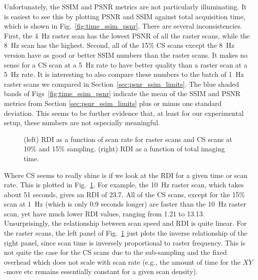 \documentclass[twocolumn,oneside]{IEEEtran/IEEEtran}
\begin{document}
Unfortunately, the SSIM and PSNR metrics are not particularly illuminating. It
is easiest to see this by plotting PSNR and SSIM against total acquisition time,
which is shown in Fig.~\ref{fig:time_ssim_psnr}. There are several
inconsistencies. First, the 4~Hz raster scan has the lowest PSNR of all the
raster scans, while the 8~Hz scan has the highest. Second, all of the 15\% CS
scans except the 8~Hz version have as good or better SSIM numbers than the
raster scans. It makes no sense for a CS scan at a 5~Hz rate to have better
quality than a raster scan at a 5~Hz rate. It is interesting to also compare
these numbers to the batch of 1~Hz raster scans we compared in
Section~\ref{sec:psnr_ssim_limits}. The blue shaded bands of
Figs~\ref{fig:time_ssim_psnr} indicate the mean of the SSIM and PSNR metrics
from Section \ref{sec:psnr_ssim_limits} plus or minus one standard deviation.
This seems to be further evidence that, at least for our experimental setup,
these numbers are not especially meaningful.

\begin{figure}[h!]
  
    
\caption{(left) RDI as a function of scan rate for raster scans and CS scans
      at 10\% and 15\% sampling. (right) RDI as a function of total imaging
      time.}
    \label{fig:time_damage}
\end{figure}

Where CS seems to really shine is if we look at the RDI for a given time or scan
rate. This is plotted in Fig.~\ref{fig:time_damage}. For example, the 10~Hz
raster scan, which takes about 51 seconds, gives an RDI of 23.7. All of the CS
scans, except for the 15\% scan at 1~Hz (which is only 0.9 seconds longer) are
faster than the 10~Hz raster scan, yet have much lower RDI values, ranging from
1.21 to 13.13. Unsurprisingly, the relationship between scan speed and RDI is
quite linear. For the raster scans, the left panel of Fig.~\ref{fig:time_damage}
just plots the inverse relationship of the right panel, since scan time is
inversely proportional to raster frequency. This is not quite the case for the
CS scans due to the sub-sampling and the fixed overhead which does not scale
with scan rate (e.g., the amount of time for the $XY$-move etc remains
essentially constant for a given scan density).
\end{document}
